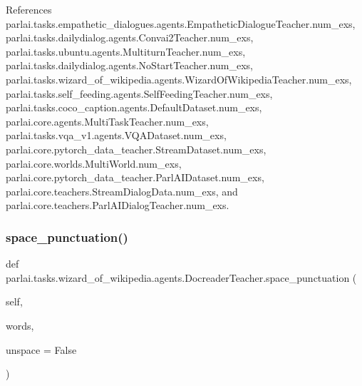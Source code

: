 References parlai.\+tasks.\+empathetic\+\_\+dialogues.\+agents.\+Empathetic\+Dialogue\+Teacher.\+num\+\_\+exs, parlai.\+tasks.\+dailydialog.\+agents.\+Convai2\+Teacher.\+num\+\_\+exs, parlai.\+tasks.\+ubuntu.\+agents.\+Multiturn\+Teacher.\+num\+\_\+exs, parlai.\+tasks.\+dailydialog.\+agents.\+No\+Start\+Teacher.\+num\+\_\+exs, parlai.\+tasks.\+wizard\+\_\+of\+\_\+wikipedia.\+agents.\+Wizard\+Of\+Wikipedia\+Teacher.\+num\+\_\+exs, parlai.\+tasks.\+self\+\_\+feeding.\+agents.\+Self\+Feeding\+Teacher.\+num\+\_\+exs, parlai.\+tasks.\+coco\+\_\+caption.\+agents.\+Default\+Dataset.\+num\+\_\+exs, parlai.\+core.\+agents.\+Multi\+Task\+Teacher.\+num\+\_\+exs, parlai.\+tasks.\+vqa\+\_\+v1.\+agents.\+V\+Q\+A\+Dataset.\+num\+\_\+exs, parlai.\+core.\+pytorch\+\_\+data\+\_\+teacher.\+Stream\+Dataset.\+num\+\_\+exs, parlai.\+core.\+worlds.\+Multi\+World.\+num\+\_\+exs, parlai.\+core.\+pytorch\+\_\+data\+\_\+teacher.\+Parl\+A\+I\+Dataset.\+num\+\_\+exs, parlai.\+core.\+teachers.\+Stream\+Dialog\+Data.\+num\+\_\+exs, and parlai.\+core.\+teachers.\+Parl\+A\+I\+Dialog\+Teacher.\+num\+\_\+exs.

\mbox{\label{classparlai_1_1tasks_1_1wizard__of__wikipedia_1_1agents_1_1DocreaderTeacher_a42fbde07e6112b1b284ef8e89283a948}} 
\subsubsection{\texorpdfstring{space\+\_\+punctuation()}{space\_punctuation()}}
{\footnotesize\ttfamily def parlai.\+tasks.\+wizard\+\_\+of\+\_\+wikipedia.\+agents.\+Docreader\+Teacher.\+space\+\_\+punctuation (\begin{DoxyParamCaption}\item[{}]{self,  }\item[{}]{words,  }\item[{}]{unspace = {\ttfamily False} }\end{DoxyParamCaption})}



